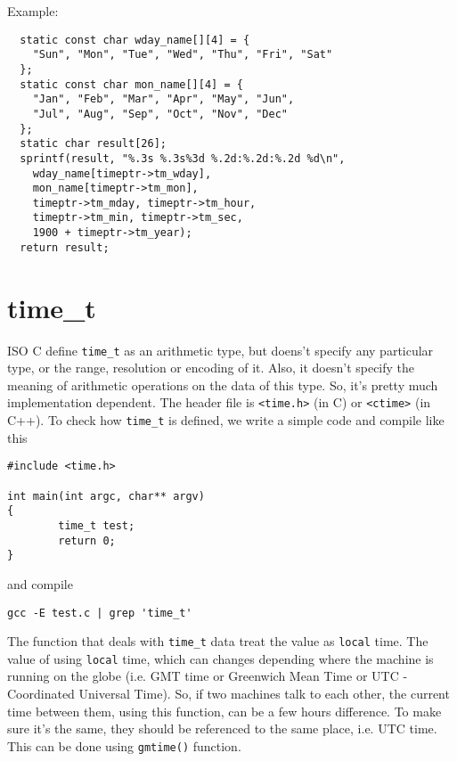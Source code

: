 Example:
\begin{verbatim}
  static const char wday_name[][4] = {
    "Sun", "Mon", "Tue", "Wed", "Thu", "Fri", "Sat"
  };
  static const char mon_name[][4] = {
    "Jan", "Feb", "Mar", "Apr", "May", "Jun",
    "Jul", "Aug", "Sep", "Oct", "Nov", "Dec"
  };
  static char result[26];
  sprintf(result, "%.3s %.3s%3d %.2d:%.2d:%.2d %d\n",
    wday_name[timeptr->tm_wday],
    mon_name[timeptr->tm_mon],
    timeptr->tm_mday, timeptr->tm_hour,
    timeptr->tm_min, timeptr->tm_sec,
    1900 + timeptr->tm_year);
  return result;
\end{verbatim} 


\section{time\_t}
\label{sec:time_t}

ISO C define \verb!time_t! as an arithmetic type, but doens't specify any
particular type, or the range, resolution or encoding of it. Also, it doesn't
specify the meaning of arithmetic operations on the data of this type. So, it's
pretty much implementation dependent. The header file is \verb!<time.h>! (in C)
or \verb!<ctime>! (in C++). To check how \verb!time_t! is defined, we write a
simple code and compile like this
\begin{verbatim}
#include <time.h>

int main(int argc, char** argv)
{
        time_t test;
        return 0;
}
\end{verbatim}
and compile
\begin{verbatim}
gcc -E test.c | grep 'time_t'
\end{verbatim}

The function that deals with \verb!time_t! data treat the value as \verb!local!
time. The value of using \verb!local! time, which can changes depending where
the machine is running on the globe (i.e. GMT time or Greenwich Mean Time or UTC
- Coordinated Universal Time). So, if two machines talk to each other, the
current time between them, using this function, can be a few hours difference.
To make sure it's the same, they should be referenced to the same place, i.e.
UTC time. This can be done using \verb!gmtime()! function.


